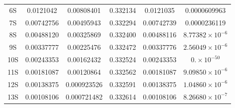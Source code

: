 \documentclass[cs4size,titlepage,twoside]{ctexart}
\begin{document}
\begin{table}[!tp]
\begin{tabular}{|cccccc|}
		6S                    & 0.0121042                                    & 0.00808401                                         & 0.332134                                           & 0.0121035                                                                             & 0.0000609963             \\
		7S                    & 0.00742756                                   & 0.00495943                                         & 0.332294                                           & 0.00742739                                                                            & 0.0000236119             \\
		8S                    & 0.00488120                                   & 0.00325869                                         & 0.332400                                           & 0.00488116                                                                            & $8.77382\times10^{-6}$   \\
		9S                    & 0.00337777                                   & 0.00225476                                         & 0.332472                                           & 0.00337776                                                                            & $2.56049\times10^{-6}$   \\
		10S                   & 0.00243353                                   & 0.00162432                                         & 0.332524                                           & 0.00243353                                                                            & $0.\times10^{-50}$       \\
		11S                   & 0.00181087                                   & 0.00120864                                         & 0.332562                                           & 0.00181087                                                                            & $9.09850\times10^{-6}$   \\
		12S                   & 0.00138375                                   & 0.000923526                                        & 0.332591                                           & 0.00138375                                                                            & $1.04860\times10^{-6}$   \\
		13S                   & 0.00108106                                   & 0.000721482                                        & 0.332614                                           & 0.00108106                                                                            & $8.26680\times10^{-7}$   \\

\end{tabular}
\end{table}
\end{document}
